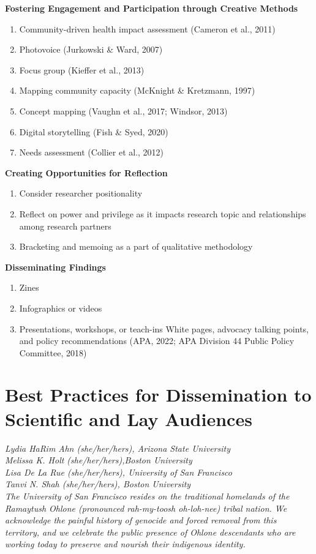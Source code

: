 \documentclass[
  11pt,
]{book}
\providecommand{\tightlist}{%
  \setlength{\itemsep}{0pt}\setlength{\parskip}{0pt}}
\begin{document}
\textbf{Fostering Engagement and Participation through Creative Methods}

\begin{enumerate}
\def\labelenumi{\arabic{enumi}.}
\tightlist
\item
  Community-driven health impact assessment (Cameron et al., 2011)
\item
  Photovoice (Jurkowski \& Ward, 2007)
\item
  Focus group (Kieffer et al., 2013)
\item
  Mapping community capacity (McKnight \& Kretzmann, 1997)
\item
  Concept mapping (Vaughn et al., 2017; Windsor, 2013)
\item
  Digital storytelling (Fish \& Syed, 2020)
\item
  Needs assessment (Collier et al., 2012)
\end{enumerate}

\textbf{Creating Opportunities for Reflection}

\begin{enumerate}
\def\labelenumi{\arabic{enumi}.}
\tightlist
\item
  Consider researcher positionality
\item
  Reflect on power and privilege as it impacts research topic and relationships among research partners
\item
  Bracketing and memoing as a part of qualitative methodology
\end{enumerate}

\textbf{Disseminating Findings}

\begin{enumerate}
\def\labelenumi{\arabic{enumi}.}
\tightlist
\item
  Zines
\item
  Infographics or videos
\item
  Presentations, workshops, or teach-ins White pages, advocacy talking points, and policy recommendations (APA, 2022; APA Division 44 Public Policy Committee, 2018)
\end{enumerate}

\chapter{Best Practices for Dissemination to Scientific and Lay Audiences}\label{Dissem}

\emph{Lydia HaRim Ahn (she/her/hers), Arizona State University}\\
\emph{Melissa K. Holt (she/her/hers),Boston University}\\
\emph{Lisa De La Rue (she/her/hers), University of San Francisco}\\
\emph{Tanvi N. Shah (she/her/hers), Boston University}\\
\emph{The University of San Francisco resides on the traditional homelands of the Ramaytush Ohlone (pronounced rah-my-toosh oh-loh-nee) tribal nation. We acknowledge the painful history of genocide and forced removal from this territory, and we celebrate the public presence of Ohlone descendants who are working today to preserve and nourish their indigenous identity.}\\
\end{document}
